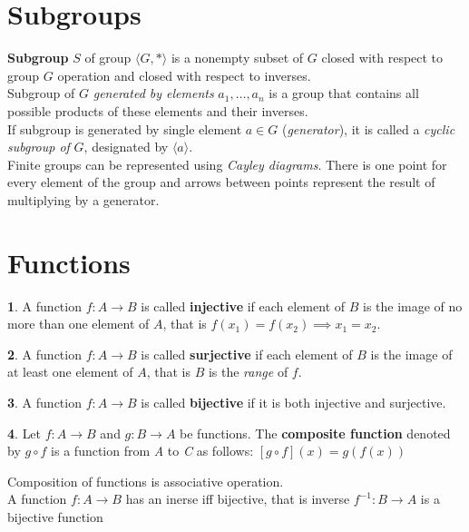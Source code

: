 \documentclass[a4paper,12pt]{article}
\theoremstyle{definition}
\newtheorem{definition}{}[section]
\theoremstyle{axiom}
\theoremstyle{theorem}
\begin{document}
\section{Subgroups}
\textbf{Subgroup} $S$ of group $\langle G, * \rangle$ is a nonempty subset of $G$ closed with respect to group $G$ operation and closed with respect to inverses.
\\
Subgroup of $G$ \textit{generated by elements} $a_1, \dots ,a_n$ is a group that contains all possible products of these elements and their inverses.
\\
If subgroup is generated by single element $a \in G$ (\textit{generator}), it is called a \textit{cyclic subgroup of} $G$, designated by $\langle a \rangle$.
\\
Finite groups can be represented using \textit{Cayley diagrams}. There is one point for every element of the group and arrows between points represent the result of multiplying by a generator.
\section{Functions}
\begin{definition}
        A function $f : A \to B$ is called \textbf{injective} if each element of $B$ is the image of no more than one element of $A$, that is $f(x_1) = f(x_2) \implies x_1 = x_2$.
\end{definition}
\begin{definition}
        A function $f : A \to B$ is called \textbf{surjective} if each element of $B$ is the image of at least one element of $A$, that is $B$ is the \textit{range} of $f$.
\end{definition}
\begin{definition}
    A function $f: A \to B$ is called \textbf{bijective} if it is both injective and surjective.
\end{definition}
\begin{definition}{}
        \textnormal{Let $f: A \to B $ and  $g: B \to A$ be functions. The \textbf{composite function} denoted by $g \circ f$ is a function from \textit{A} to \textit{C} as follows:
        $[g \circ f](x) = g(f(x))$ }
\end{definition}
Composition of functions is associative operation.
\\
A function $f: A \to B$ has an inerse iff bijective, that is inverse $f^{-1}: B \to A$ is a bijective function
\end{document}
